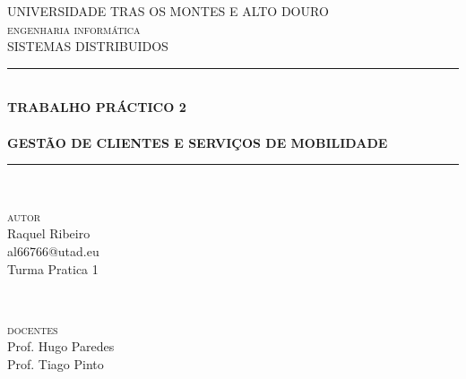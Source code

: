\documentclass[12pt]{article}
\author{dxcccii}
\begin{document}

\begin{titlepage} %
	\newcommand{\HRule}{\rule{\linewidth}{0.5mm}} %
	
	\center %
	
	
	\textsc{\LARGE UNIVERSIDADE TRAS OS MONTES E ALTO DOURO}\\[1.5cm] %
	
	\textsc{\Large engenharia informática}\\[0.5cm] %
	
	\textsc{\large SISTEMAS DISTRIBUIDOS}\\[0.5cm] %
	
	
	\HRule\\[0.4cm]
	
	{\huge\bfseries TRABALHO PRÁCTICO 2\\ 
	\hfill \\
	GESTÃO DE CLIENTES E SERVIÇOS DE MOBILIDADE}\\[0.4cm] %
	
	\HRule\\[1.5cm]
	
	
	\begin{minipage}{0.4\textwidth}
		\begin{flushleft}
			{\Large
			\textsc{autor}}\\
			 {\large Raquel Ribeiro\\ al66766@utad.eu\\Turma Pratica 1} %
		\end{flushleft}
	\end{minipage}
	~
	\begin{minipage}{0.4\textwidth}
		\begin{flushright}
			\Large
			\textsc{docentes}\\
			{\large Prof. Hugo Paredes\\ Prof. Tiago Pinto }
		\end{flushright}
	\end{minipage}


\end{titlepage}
\end{document}
